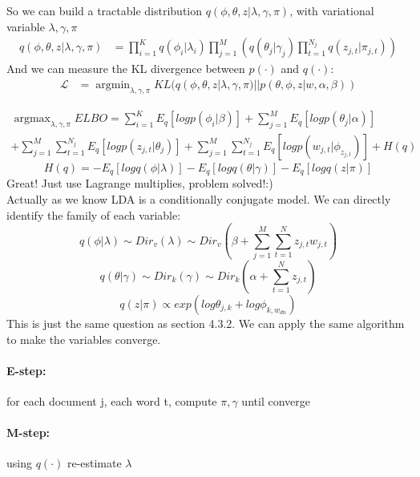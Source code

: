 \documentclass{article}
\begin{document}
So we can build a tractable distribution $q(\phi,\theta,z|\lambda ,\gamma, \pi)$, with variational variable $\lambda ,\gamma, \pi$
\begin{align*}
q(\phi,\theta,z|\lambda ,\gamma, \pi) &= \prod_{i=1}^{K}q(\phi_{i}|\lambda_{i}) \prod_{j=1}^{M}\left(q(\theta_{j}|\gamma_{j})\prod_{t=1}^{N_{j}}q(z_{j,t}|\pi_{j,t})\right)
\end{align*}
And we can measure the KL divergence between $p(\cdot)$ and $q(\cdot)$:
\begin{align*}
\mathcal{L} &= \mathop{\arg\min}_{\lambda ,\gamma, \pi} KL(q(\phi,\theta,z|\lambda ,\gamma, \pi)||p(\theta,\phi,z|w,\alpha,\beta))
\end{align*}

\begin{align*}
\mathop{\arg\max}_{\lambda ,\gamma, \pi} ELBO =\sum_{i=1}^{K}E_{q}[log p(\phi_{i}|\beta)]+\sum_{j=1}^{M}E_{q}[log p(\theta_{j}|\alpha)] \\
+\sum_{j=1}^{M}\sum_{t=1}^{N_{j}}E_{q}[logp(z_{j,t}|\theta_{j})] 
+\sum_{j=1}^{M}\sum_{t=1}^{N_{j}}E_{q}[logp(w_{j,t}|\phi_{z_{j,t}})]
+H(q)
\end{align*}
$$H(q)=-E_{q}[logq(\phi|\lambda)]-E_{q}[logq(\theta|\gamma)]-E_{q}[logq(z|\pi)]$$
Great! Just use Lagrange multiplies, problem solved!:) \\

Actually as we know LDA is a conditionally conjugate model. We can directly identify the family of each variable:
$$q(\phi|\lambda) \sim Dir_{v}(\lambda) \sim Dir_{v}\left(\beta+\sum_{j=1}^{M}\sum_{t=1}^{N}z_{j,t} w_{j,t} \right)$$
$$q(\theta|\gamma) \sim Dir_{k}(\gamma) \sim  Dir_{k}(\alpha+\sum_{t=1}^{N}z_{j,t}) $$
$$q(z|\pi) \propto exp(log \theta_{j,k}+log \phi_{k,w_{dn}})$$
This is just the same question as section 4.3.2. We can apply the same algorithm to make the variables converge.
\paragraph{E-step:} for each document j, each word t, compute $\pi, \gamma$ until converge
\paragraph{M-step:} using $q(\cdot)$ re-estimate $\lambda$



\end{document}
